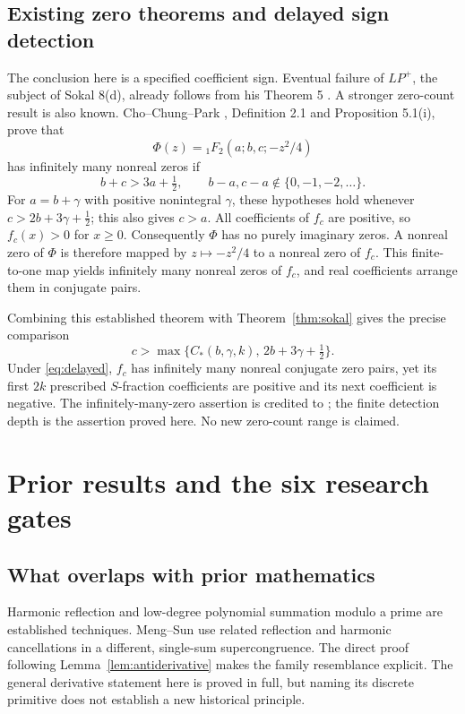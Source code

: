 \documentclass[11pt,a4paper]{article}
\theoremstyle{remark}
\newcommand{\LP}{LP^+}
\begin{document}
\subsection{Existing zero theorems and delayed sign detection}
\label{sec:zeros}
The conclusion here is a specified coefficient sign. Eventual failure
of $\LP$, the subject of Sokal 8(d), already follows from his
Theorem 5 \cite{sokal2022}. A stronger zero-count result is also known.
Cho--Chung--Park \cite{cho2026}, Definition 2.1 and Proposition 5.1(i),
prove that
\[
 \Phi(z)={}_1F_2(a;b,c;-z^2/4)
\]
has infinitely many nonreal zeros if
\[
 b+c>3a+\tfrac12,\qquad
 b-a,c-a\notin\{0,-1,-2,\ldots\}.
\]
For $a=b+\gamma$ with positive nonintegral $\gamma$, these hypotheses
hold whenever $c>2b+3\gamma+\tfrac12$; this also gives $c>a$.
All coefficients of $f_c$ are positive, so $f_c(x)>0$ for $x\ge0$.
Consequently $\Phi$ has no purely imaginary zeros. A nonreal zero of
$\Phi$ is therefore mapped by $z\mapsto-z^2/4$ to a nonreal zero of
$f_c$. This finite-to-one map yields infinitely many nonreal zeros of
$f_c$, and real coefficients arrange them in conjugate pairs.

Combining this established theorem with Theorem~\ref{thm:sokal} gives
the precise comparison
\begin{equation}\label{eq:delayed}
 c>\max\{C_*(b,\gamma,k),\,2b+3\gamma+\tfrac12\}.
\end{equation}
Under \eqref{eq:delayed}, $f_c$ has infinitely many nonreal conjugate
zero pairs, yet its first $2k$ prescribed $S$-fraction coefficients are
positive and its next coefficient is negative. The infinitely-many-zero
assertion is credited to \cite{cho2026}; the finite detection depth is
the assertion proved here. No new zero-count range is claimed.

\section{Prior results and the six research gates}\label{sec:priority}
\subsection{What overlaps with prior mathematics}
Harmonic reflection and low-degree polynomial summation modulo a prime
are established techniques. Meng--Sun \cite{mengsun2015} use related
reflection and harmonic cancellations in a different, single-sum
supercongruence. The direct proof following
Lemma~\ref{lem:antiderivative} makes the family resemblance explicit.
The general derivative statement here is proved in full, but naming
its discrete primitive does not establish a new historical principle.
\end{document}

